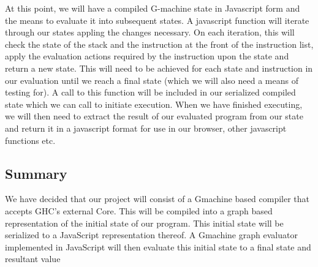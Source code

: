 At this point, we will have a compiled G-machine state 
in Javascript form and the means to evaluate it into
subsequent states. 
A javascript function will iterate through our states
appling the changes necessary. On each iteration, this
will check the state of the stack and
the instruction at the front of the instruction list,
apply the evaluation actions required by the instruction
upon the state and return a new state. This will need 
to be achieved for each state and instruction in our
evaluation until we reach a final state (which we will
also need a means of testing for). A call to this
function will be included in our serialized compiled
state which we can call to initiate execution.
When we have finished executing, we will then need
to extract the result of our evaluated program from
our state and return it in a javascript format for 
use in our browser, other javascript functions etc.

\subsection{Summary}
We have decided that our project will consist of a Gmachine
based compiler that accepts GHC's external Core. This 
will be compiled into a graph based representation of the
initial state of our program. This initial state will be
serialized to a JavaScript representation thereof. A 
Gmachine graph evaluator implemented in JavaScript will
then evaluate this initial state to a final state and
resultant value
